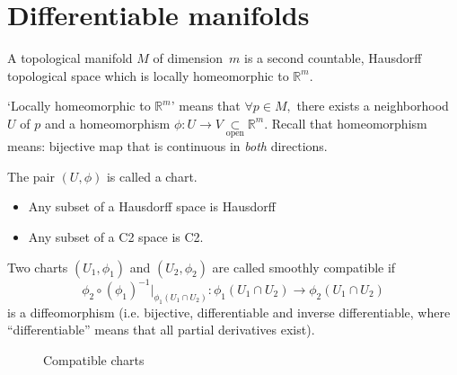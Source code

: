 \section{Differentiable manifolds}
\begin{definition}
    A topological manifold $M$ of dimension~$m$ is a second countable, Hausdorff topological space which is locally homeomorphic to $\mathbb R^{m}$.
\end{definition}
\begin{remark}
`Locally homeomorphic to $\mathbb R^{m}$' means that $\forall p \in M, $ there exists a neighborhood $U$ of $p$ and a homeomorphism $\phi: U \to  V \underset{\text{open}}{\subset} \mathbb R^{m}$. Recall that homeomorphism means: bijective map that is continuous in \emph{both} directions.   
\end{remark}

\begin{definition}[Chart]
    The pair $(U, \phi)$ is called a chart.
\end{definition}

\begin{remark}\leavevmode 
    \begin{itemize}
        \item Any subset of a Hausdorff space is Hausdorff
        \item Any subset of a C2 space is C2.
    \end{itemize}
\end{remark}



\begin{definition}[Compatibility]
    Two charts $(U_1, \phi_1)$ and $(U_2, \phi_2)$ are called smoothly compatible if 
    \[
        \phi_2 \circ(\phi_1)^{-1}  |_{\phi_1(U_1 \cap  U_2)}: \phi_1(U_1 \cap  U_2) \to  \phi_2(U_1 \cap U_2)
    \] 
    is a diffeomorphism (i.e. bijective, differentiable and inverse differentiable, where ``differentiable'' means that all partial derivatives exist).
\end{definition}

\begin{figure}[ht]
    \centering
    \caption{Compatible charts}
    \label{fig:compatible}
\end{figure}

